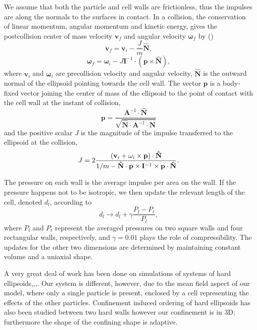 \documentclass{article}
\begin{document}
We assume that both the particle and cell walls are frictionless, thus the
impulses are along the normals to the surfaces in contact. In a collision,
the conservation of linear momentum, angular momentum and kinetic energy,
gives the postcollision center of mass velocity $\mathbf{v}_{f}$ and angular
velocity $\boldsymbol{\omega }_{f}$ by (\cite{paradox})%
\begin{equation}
\mathbf{v}_{f}=\mathbf{v}_{i}-\frac{J}{m}\mathbf{\hat{N}},
\end{equation}%
\begin{equation}
\boldsymbol{\omega }_{f}=\boldsymbol{\omega }_{i}-J\mathbf{I}^{-1}\cdot (%
\mathbf{p\times \hat{N}}),
\end{equation}%
where $\mathbf{v}_{i}$ and $\boldsymbol{\omega }_{i}$ are precollision
velocity and angular velocity, $\mathbf{\hat{N}}$ is the outward normal of
the ellipsoid pointing towards the cell wall. The vector $\mathbf{p}$ is a
body-fixed vector joining the center of mass of the ellipsoid to the point
of contact with the cell wall at the instant of collision, 
\begin{equation}
\mathbf{p}=\frac{\mathbf{A}^{-1}\cdot \mathbf{\hat{N}}}{\sqrt{\mathbf{\hat{N}%
}\cdot \mathbf{A}^{-1}\cdot \mathbf{\hat{N}}}}
\end{equation}%
and the positive scalar $J$ is the magnitude of the impulse transferred to
the ellipsoid at the collision, 
\begin{equation}
J=2\frac{(\mathbf{\mathbf{v}}_{i}+\mathbf{\mathbf{\omega }}_{i}\times 
\mathbf{p)\cdot \hat{N}}}{1/m-\mathbf{\hat{N}}\cdot \mathbf{p}\times \mathbf{%
I}^{-1}\times \mathbf{p}\cdot \mathbf{\hat{N}}}.  \label{6}
\end{equation}

The pressure on each wall is the average impulse per area on the wall. If
the pressure happens not to be isotropic, we then update the relevant length
of the cell, denoted $d_l$, according to 
\begin{equation}
d_{l}\rightarrow d_{l}+\gamma \frac{P_{l}-P_{t}}{P_{l}},
\end{equation}%
where $P_{l}$ and $P_{t}$ represent the averaged pressures on two square
walls and four rectangular walls, respectively, and $\gamma =0.01$ plays the
role of compressibility. The updates for the other two dimensions are
determined by maintaining constant volume and a uniaxial shape.

A very great deal of work has been done on simulations of systems of hard
ellipsoids\cite{Frenkel},\cite{Perram},\cite{odriozola},\cite{Berne}. Our
system is different, however, due to the mean field aspect of our model,
where only a single particle is present, enclosed by a cell representing the
effects of the other particles. Confinement induced ordering of hard
ellipsoids has also been studied between two hard walls \cite{Mao} 
however our confinement is in 3D; furthermore the shape of the confining shape
is adaptive.
\end{document}
